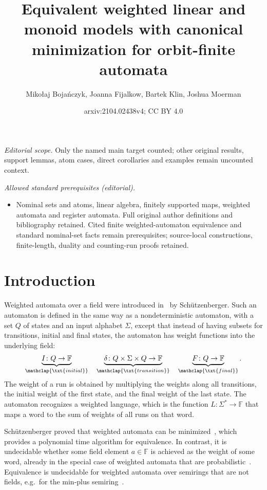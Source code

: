 \documentclass[10pt,a4paper]{amsart}
\title{Equivalent weighted linear and monoid models with canonical minimization for orbit-finite automata}
\author{Mikołaj Bojańczyk, Joanna Fijalkow, Bartek Klin, Joshua Moerman}
\date{arxiv:2104.02438v4; CC BY 4.0}
\numberwithin{equation}{section}
\newcommand{\myunderbrace}[2]{\underbrace{#1}_{\mathclap{\txt{\scriptsize #2}}}}
\newcommand{\field}{\mathbb F}
\newcommand{\schutz}{Sch\"utzenberger\xspace}
\begin{document}
\maketitle
\noindent\textit{Editorial scope.} Only the named main target counted; other original results, support lemmas, atom cases, direct corollaries and examples remain uncounted context.\par\medskip
\noindent\textit{Allowed standard prerequisites (editorial).}\begin{itemize}
\item Nominal sets and atoms, linear algebra, finitely supported maps, weighted automata and register automata. Full original author definitions and bibliography retained. Cited finite weighted-automaton equivalence and standard nominal-set facts remain prerequisites; source-local constructions, finite-length, duality and counting-run proofs retained.
\end{itemize}\medskip
\section{Introduction}
Weighted automata over a field were introduced in~\cite{schutzenberger1961definition} by \schutz. Such an automaton is defined in the same way as a nondeterministic automaton, with a set $Q$ of states and an input alphabet $\Sigma$, except that instead of having subsets for transitions, initial and final states, the automaton has weight functions into the underlying field:
\begin{align*}
    \myunderbrace{I \colon Q \to \field}{initial} 
    \quad 
    \myunderbrace{\delta \colon Q \times \Sigma \times Q \to \field}{transition}
    \quad 
    \myunderbrace{F \colon Q \to \field}{final}.
\end{align*}
The weight of a run is obtained by multiplying the weights along all transitions, the initial weight of the first state, and the final weight of the last state. The  automaton recognizes a weighted language, which  is the function $L \colon \Sigma^* \to \field$ that maps a word to the sum of weights of all runs on that word.   

\schutz proved that weighted automata can be minimized~\cite[Sec.~B]{schutzenberger1961definition},
which provides a polynomial time algorithm for equivalence.
In contrast, it is undecidable whether some field element $a \in \field$ is achieved as the weight of some  word,  already in the special case of weighted automata that are probabilistic~\cite[Thm.~22]{nasu1969mappings}. Equivalence  is undecidable for weighted automata over semirings that are not fields, e.g.~for the min-plus semiring~\cite[Cor.~4.3]{krob1992}.
\end{document}
